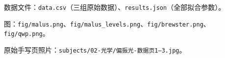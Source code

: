 \documentclass[11pt]{ctexart}
\begin{document}
\flowerrule

{\small\color{inkgray} 数据文件：\texttt{data.csv}（三组原始数据）、\texttt{results.json}（全部拟合参数）。}

{\small\color{inkgray} 图：\texttt{fig/malus.png}、\texttt{fig/malus\_levels.png}、\texttt{fig/brewster.png}、\texttt{fig/qwp.png}。}

{\small\color{inkgray} 原始手写页照片：\texttt{subjects/02-光学/偏振光-数据页1--3.jpg}。}
\end{document}
